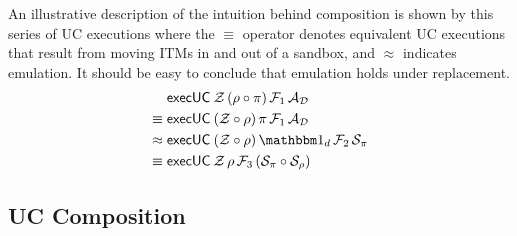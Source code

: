 An illustrative description of the intuition behind composition is shown by this series of UC executions where the $\equiv$ operator denotes equivalent UC executions that result from moving ITMs in and out of a sandbox, and $\approx$ indicates emulation. It should be easy to conclude that emulation holds under replacement.
\begin{align}
& \msf{execUC} \: \Z \, (\rho \circ \pi) \, \F_1 \, \DA \\
\equiv \; & \msf{execUC} \: (\Z \circ \rho) \, \pi \, \F_1 \, \DA \\
\approx \; & \msf{execUC} \: (\Z \circ \rho) \, \idealP \, \F_2 \, \SIM{\pi} \\
\equiv \; & \msf{execUC} \: \Z \, \rho \, \F_3 \, (\SIM{\pi} \circ \SIM{\rho})
\end{align}



\subsection{UC Composition}

